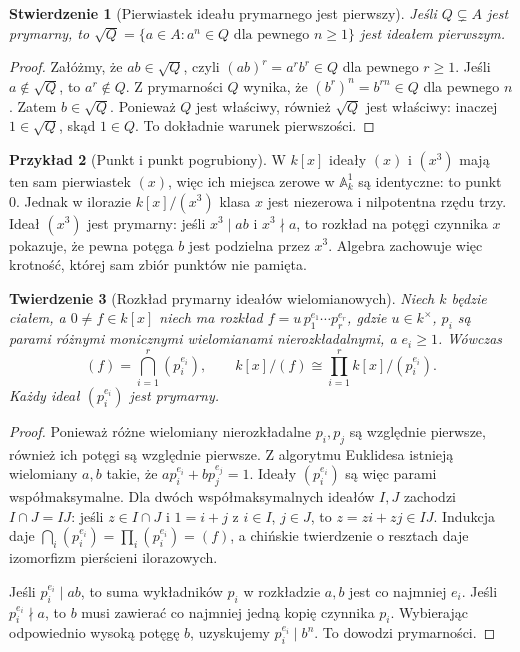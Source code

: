 \documentclass[11pt,a4paper,openany]{report}
\numberwithin{equation}{section}
\theoremstyle{plain}
\newtheorem{twierdzenie}{Twierdzenie}[section]
\newtheorem{stwierdzenie}[twierdzenie]{Stwierdzenie}
\theoremstyle{definition}
\newtheorem{przyklad}[twierdzenie]{Przykład}
\theoremstyle{remark}
\newcommand{\A}{\mathbb A}
\begin{document}
\begin{stwierdzenie}[Pierwiastek ideału prymarnego jest pierwszy]
Jeśli $Q\subsetneq A$ jest prymarny, to
$\sqrt Q=\{a\in A:a^n\in Q\text{ dla pewnego }n\ge1\}$
jest ideałem pierwszym.
\end{stwierdzenie}
\begin{proof}
Załóżmy, że $ab\in\sqrt Q$, czyli
$(ab)^r=a^rb^r\in Q$ dla pewnego $r\ge1$.
Jeśli $a\notin\sqrt Q$, to $a^r\notin Q$.
Z prymarności $Q$ wynika, że
$(b^r)^n=b^{rn}\in Q$ dla pewnego $n$.
Zatem $b\in\sqrt Q$. Ponieważ $Q$ jest właściwy,
również $\sqrt Q$ jest właściwy: inaczej
$1\in\sqrt Q$, skąd $1\in Q$. To dokładnie
warunek pierwszości.
\end{proof}

\begin{przyklad}[Punkt i punkt pogrubiony]
W $k[x]$ ideały $(x)$ i $(x^3)$ mają ten sam
pierwiastek $(x)$, więc ich miejsca zerowe
w $\A^1_k$ są identyczne: to punkt $0$.
Jednak w ilorazie $k[x]/(x^3)$ klasa $x$
jest niezerowa i nilpotentna rzędu trzy.
Ideał $(x^3)$ jest prymarny: jeśli $x^3\mid ab$
i $x^3\nmid a$, to rozkład na potęgi czynnika
$x$ pokazuje, że pewna potęga $b$ jest podzielna
przez $x^3$. Algebra zachowuje więc krotność,
której sam zbiór punktów nie pamięta.
\end{przyklad}

\begin{twierdzenie}[Rozkład prymarny ideałów wielomianowych]
\label{tw:primary-kx}
Niech $k$ będzie ciałem, a $0\ne f\in k[x]$
niech ma rozkład
$f=u\,p_1^{e_1}\cdots p_r^{e_r}$,
gdzie $u\in k^\times$, $p_i$ są parami
różnymi monicznymi wielomianami nierozkładalnymi,
a $e_i\ge1$. Wówczas
\[
 (f)=\bigcap_{i=1}^r(p_i^{e_i}),\qquad
 k[x]/(f)\cong\prod_{i=1}^r k[x]/(p_i^{e_i}).
\]
Każdy ideał $(p_i^{e_i})$ jest prymarny.
\end{twierdzenie}
\begin{proof}
Ponieważ różne wielomiany nierozkładalne $p_i,p_j$
są względnie pierwsze, również ich potęgi są
względnie pierwsze. Z algorytmu Euklidesa
istnieją wielomiany $a,b$ takie, że
$ap_i^{e_i}+bp_j^{e_j}=1$.
Ideały $(p_i^{e_i})$ są więc parami współmaksymalne.
Dla dwóch współmaksymalnych ideałów $I,J$
zachodzi $I\cap J=IJ$: jeśli $z\in I\cap J$
i $1=i+j$ z $i\in I$, $j\in J$, to
$z=zi+zj\in IJ$. Indukcja daje
$\bigcap_i(p_i^{e_i})=\prod_i(p_i^{e_i})=(f)$,
a chińskie twierdzenie o resztach daje izomorfizm
pierścieni ilorazowych.

Jeśli $p_i^{e_i}\mid ab$, to suma wykładników
$p_i$ w rozkładzie $a,b$ jest co najmniej $e_i$.
Jeśli $p_i^{e_i}\nmid a$, to $b$ musi zawierać
co najmniej jedną kopię czynnika $p_i$.
Wybierając odpowiednio wysoką potęgę $b$,
uzyskujemy $p_i^{e_i}\mid b^n$.
To dowodzi prymarności.
\end{proof}
\end{document}
